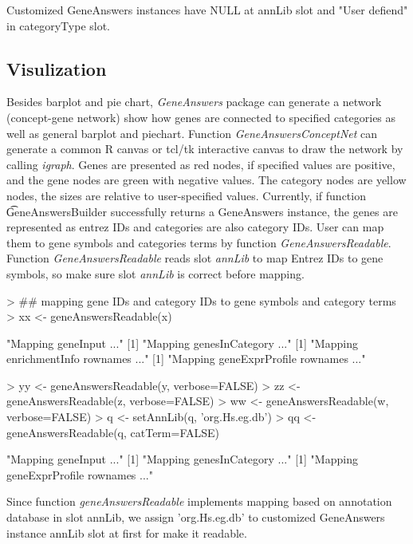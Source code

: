 \documentclass[a4paper]{article}
\newcommand{\Rpackage}[1]{{\textit{#1}}}
\begin{document}
Customized GeneAnswers instances have NULL at annLib slot and "User defiend" in categoryType slot.
 
\subsection{Visulization}
Besides barplot and pie chart, \Rpackage{GeneAnswers} package can generate a network (concept-gene network)  show how genes are connected to specified categories as well as general barplot and piechart. Function {\it GeneAnswersConceptNet} can generate a common R canvas or tcl/tk interactive canvas to draw the network by calling  \Rpackage{igraph}. Genes are presented as red nodes, if specified values are positive, and the gene nodes are green with negative values. The category nodes are yellow nodes, the sizes are relative to user-specified values. Currently, if function {\t GeneAnswersBuilder} successfully returns a GeneAnswers instance, the genes are represented as entrez IDs and categories are also category IDs. User can map them to gene symbols and categories terms by function {\it GeneAnswersReadable}. Function {\it GeneAnswersReadable} reads slot {\it annLib} to map Entrez IDs to gene symbols, so make sure slot {\it annLib} is correct before mapping.

\begin{Schunk}
\begin{Sinput}
> ## mapping gene IDs and category IDs to gene symbols and category terms
> xx <- geneAnswersReadable(x)
\end{Sinput}
\begin{Soutput}
[1] "Mapping geneInput ..."
[1] "Mapping genesInCategory ..."
[1] "Mapping enrichmentInfo rownames ..."
[1] "Mapping geneExprProfile rownames ..."
\end{Soutput}
\begin{Sinput}
> yy <- geneAnswersReadable(y, verbose=FALSE)
> zz <- geneAnswersReadable(z, verbose=FALSE)
> ww <- geneAnswersReadable(w, verbose=FALSE)
> q <- setAnnLib(q, 'org.Hs.eg.db')
> qq <- geneAnswersReadable(q, catTerm=FALSE) 
\end{Sinput}
\begin{Soutput}
[1] "Mapping geneInput ..."
[1] "Mapping genesInCategory ..."
[1] "Mapping geneExprProfile rownames ..."
\end{Soutput}
\end{Schunk}

Since function {\it geneAnswersReadable} implements mapping based on annotation database  in slot annLib, we assign 'org.Hs.eg.db' to customized GeneAnswers instance annLib slot at first for make it readable.
\end{document}
